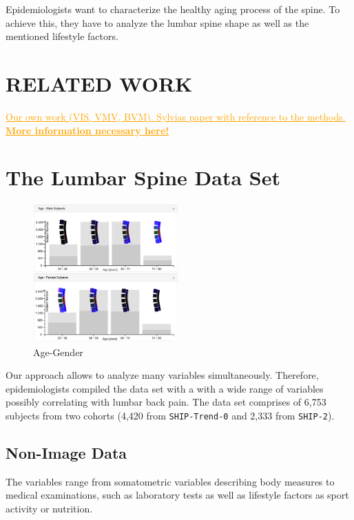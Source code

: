\documentclass[a4paper,twoside]{style/article}
\newcommand{\com}[1]{\textcolor{orange}{\uline{#1}}}
\begin{document}
Epidemiologists want to characterize the healthy aging process of the spine.
To achieve this, they have to analyze the lumbar spine shape as well as the mentioned lifestyle factors.
\section{\uppercase{Related Work}}
\label{sec:RelatedWork}
\noindent \com{Our own work (VIS, VMV, BVM). Sylvias paper with reference to the methods. \textbf{More information necessary here!}}

\section{The Lumbar Spine Data Set}
\begin{figure}[!h]
  \centering
  \includegraphics[width=0.5\textwidth]{figures/age-gender}
  \caption{Age-Gender}
  \label{fig:example1}
\end{figure}
\label{sec:MaterialsAndMethod}
Our approach allows to analyze many variables simultaneously.
Therefore, epidemiologists compiled the data set with a with a wide range of variables possibly correlating with lumbar back pain.
The data set comprises of 6,753 subjects from two cohorts (4,420 from \texttt{SHIP-Trend-0} and 2,333 from \texttt{SHIP-2}).

\subsection{Non-Image Data}
The variables range from somatometric variables describing body measures to medical examinations, such as laboratory tests as well as lifestyle factors as sport activity or nutrition.
\end{document}
